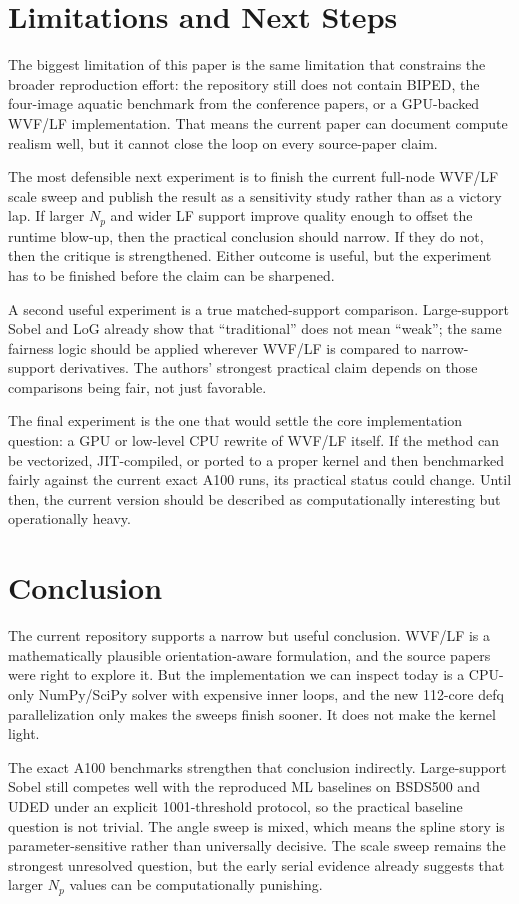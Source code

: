 \documentclass[conference]{IEEEtran}
\begin{document}
\section{Limitations and Next Steps}
The biggest limitation of this paper is the same limitation that constrains the broader reproduction effort: the repository still does not contain BIPED, the four-image aquatic benchmark from the conference papers, or a GPU-backed WVF/LF implementation. That means the current paper can document compute realism well, but it cannot close the loop on every source-paper claim.

The most defensible next experiment is to finish the current full-node WVF/LF scale sweep and publish the result as a sensitivity study rather than as a victory lap. If larger $N_p$ and wider LF support improve quality enough to offset the runtime blow-up, then the practical conclusion should narrow. If they do not, then the critique is strengthened. Either outcome is useful, but the experiment has to be finished before the claim can be sharpened.

A second useful experiment is a true matched-support comparison. Large-support Sobel and LoG already show that ``traditional'' does not mean ``weak''; the same fairness logic should be applied wherever WVF/LF is compared to narrow-support derivatives. The authors' strongest practical claim depends on those comparisons being fair, not just favorable.

The final experiment is the one that would settle the core implementation question: a GPU or low-level CPU rewrite of WVF/LF itself. If the method can be vectorized, JIT-compiled, or ported to a proper kernel and then benchmarked fairly against the current exact A100 runs, its practical status could change. Until then, the current version should be described as computationally interesting but operationally heavy.

\section{Conclusion}
The current repository supports a narrow but useful conclusion. WVF/LF is a mathematically plausible orientation-aware formulation, and the source papers were right to explore it. But the implementation we can inspect today is a CPU-only NumPy/SciPy solver with expensive inner loops, and the new 112-core defq parallelization only makes the sweeps finish sooner. It does not make the kernel light.

The exact A100 benchmarks strengthen that conclusion indirectly. Large-support Sobel still competes well with the reproduced ML baselines on BSDS500 and UDED under an explicit 1001-threshold protocol, so the practical baseline question is not trivial. The angle sweep is mixed, which means the spline story is parameter-sensitive rather than universally decisive. The scale sweep remains the strongest unresolved question, but the early serial evidence already suggests that larger $N_p$ values can be computationally punishing.
\end{document}
